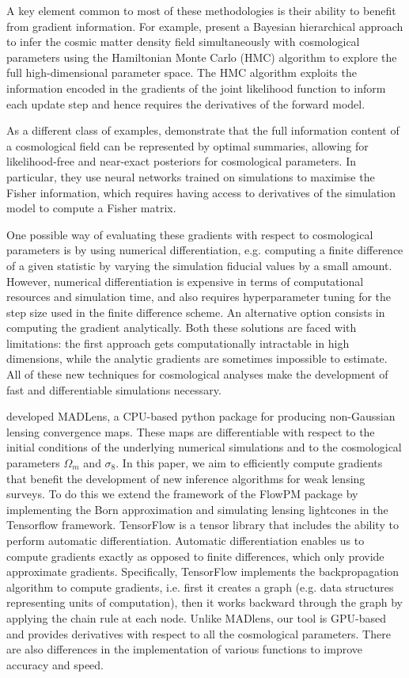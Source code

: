 \documentclass[twocolumn,twocolappendix]{aastex63}
\begin{document}
A key element common to most of these methodologies is their ability to benefit from gradient information. 
For example, \cite{porqueres2021bayesian} present a Bayesian hierarchical approach to infer the cosmic matter density field simultaneously with cosmological parameters using the Hamiltonian Monte Carlo (HMC) algorithm to explore the full high-dimensional parameter space. The HMC algorithm exploits the information encoded in the gradients of the joint likelihood function to inform each update step and hence requires the derivatives of the forward model. 

 As a different class of examples, \cite{makinen2021lossless} demonstrate that the full information content of a cosmological field can be represented by optimal summaries, allowing for likelihood-free and near-exact posteriors for cosmological parameters. In particular, they use neural networks trained on simulations to maximise the Fisher information, which requires having access to derivatives of the simulation model to compute a Fisher matrix.  

One possible way of evaluating these gradients with respect to cosmological parameters is by using numerical differentiation, e.g. computing a finite difference of a given statistic by varying the simulation fiducial values by a small amount.
However, numerical differentiation is expensive in terms of computational resources and simulation time, and also requires hyperparameter tuning for the step size used in the finite difference scheme. An alternative option consists in computing the gradient analytically. Both these solutions are faced with limitations: the first approach gets computationally intractable in high dimensions, while the analytic gradients are sometimes impossible to estimate.
All of these new techniques for cosmological analyses make the development of fast and differentiable simulations necessary.

\cite{bohm2021madlens} developed MADLens, a CPU-based python package for producing non-Gaussian lensing convergence maps. These maps are differentiable with respect to the initial conditions of the underlying numerical simulations and to the cosmological parameters $\Omega_m$ and $\sigma_8$. In this paper,  we aim to efficiently compute gradients that benefit the development of new inference algorithms for weak lensing surveys. To do this we extend the framework of the FlowPM package \cite{modi2021flowpm} by implementing the Born approximation and simulating lensing lightcones in the Tensorflow framework. TensorFlow is a tensor library that includes the ability to perform automatic differentiation. Automatic differentiation enables us to compute gradients exactly as opposed to finite differences, which only provide approximate gradients. Specifically, TensorFlow implements the backpropagation algorithm to compute gradients, i.e. first it creates a graph (e.g. data structures representing units of computation), then it works backward through the graph by applying the chain rule at each node. Unlike MADlens, our tool is GPU-based and provides derivatives with respect to all the cosmological parameters. There are also differences in the implementation of various functions to improve accuracy and speed.
\end{document}

